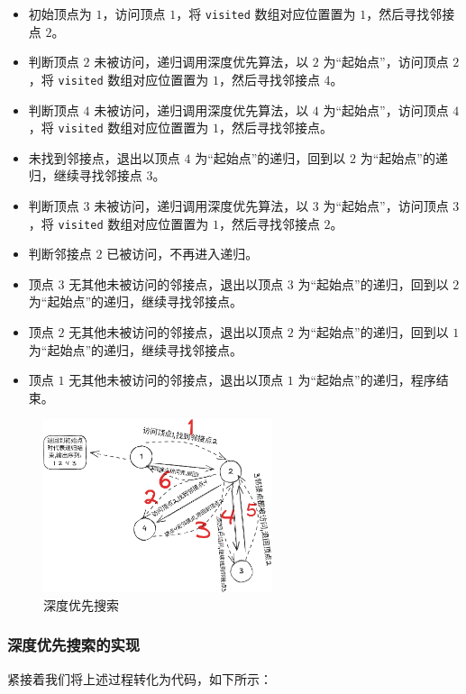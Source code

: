 \documentclass[lang=cn,newtx,10pt,scheme=chinese]{../elegantbook}
\begin{document}
\begin{itemize}
  \item 初始顶点为 $1$，访问顶点 $1$，将 \texttt{visited} 数组对应位置置为 $1$，然后寻找邻接点 $2$。  
  \item 判断顶点 $2$ 未被访问，递归调用深度优先算法，以 $2$ 为“起始点”，访问顶点 $2$，将 \texttt{visited} 数组对应位置置为 $1$，然后寻找邻接点 $4$。  
  \item 判断顶点 $4$ 未被访问，递归调用深度优先算法，以 $4$ 为“起始点”，访问顶点 $4$，将 \texttt{visited} 数组对应位置置为 $1$，然后寻找邻接点。  
  \item 未找到邻接点，退出以顶点 $4$ 为“起始点”的递归，回到以 $2$ 为“起始点”的递归，继续寻找邻接点 $3$。  
  \item 判断顶点 $3$ 未被访问，递归调用深度优先算法，以 $3$ 为“起始点”，访问顶点 $3$，将 \texttt{visited} 数组对应位置置为 $1$，然后寻找邻接点 $2$。  
  \item 判断邻接点 $2$ 已被访问，不再进入递归。  
  \item 顶点 $3$ 无其他未被访问的邻接点，退出以顶点 $3$ 为“起始点”的递归，回到以 $2$ 为“起始点”的递归，继续寻找邻接点。  
  \item 顶点 $2$ 无其他未被访问的邻接点，退出以顶点 $2$ 为“起始点”的递归，回到以 $1$ 为“起始点”的递归，继续寻找邻接点。  
  \item 顶点 $1$ 无其他未被访问的邻接点，退出以顶点 $1$ 为“起始点”的递归，程序结束。
\end{itemize}

\begin{figure}[!htbp]
  \centering
  \includegraphics[width=0.6\textwidth]{./figure/pdf/cropped/depthFirst.pdf}
  \caption{深度优先搜索}
  \label{fig:depthFirst}
\end{figure}


\subsubsection{深度优先搜索的实现}
紧接着我们将上述过程转化为代码，如下所示：
\end{document}
